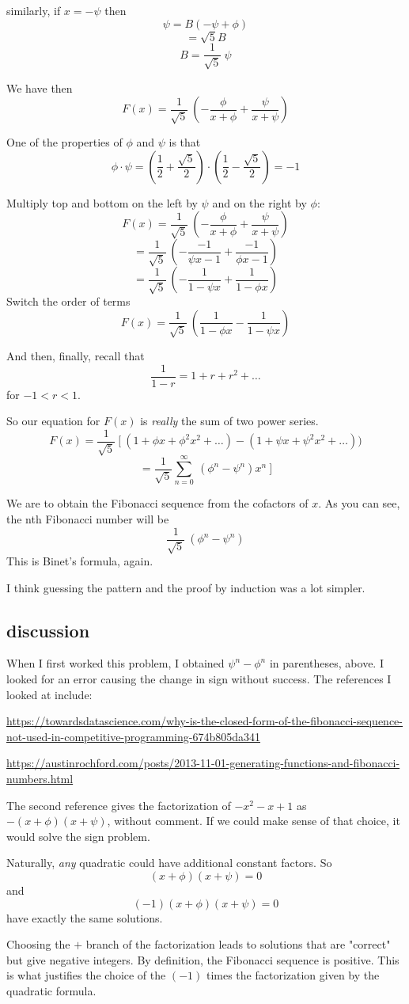 \documentclass[11pt, oneside]{article}
\begin{document}
similarly, if $x = - \psi$ then
\[ \psi = B (- \psi + \phi)  \]
\[ = \sqrt{5} B \]
\[ B = \frac{1}{\sqrt{5}} \ \psi \]

We have then
\[ F(x) = \frac{1}{\sqrt{5}} \ ( - \frac{\phi}{x + \phi} + \frac{\psi}{x + \psi}  )\]

One of the properties of $\phi$ and $\psi$ is that
\[ \phi \cdot \psi = (\frac{1}{2} + \frac{\sqrt{5}}{2}) \cdot  (\frac{1}{2} - \frac{\sqrt{5}}{2}) = - 1 \]

Multiply top and bottom on the left by $\psi$ and on the right by $\phi$:
\[ F(x) = \frac{1}{\sqrt{5}} \ ( - \frac{\phi}{x + \phi} + \frac{\psi}{x + \psi}  )\]
\[ = \frac{1}{\sqrt{5}} \ ( - \frac{-1}{\psi x - 1} + \frac{-1}{\phi x - 1}  )\]
\[  = \frac{1}{\sqrt{5}} \ ( - \frac{1}{1 - \psi x} + \frac{1}{1 - \phi x}  )\]
Switch the order of terms
\[ F(x)  = \frac{1}{\sqrt{5}} \ (\frac{1}{1 - \phi x}  - \frac{1}{1 - \psi x} )\]

And then, finally, recall that 
\[ \frac{1}{1 - r} = 1 + r + r^2 + \dots \]
for $-1 < r < 1$.

So our equation for $F(x)$ is \emph{really} the sum of two power series.
\[ F(x) = \frac{1}{\sqrt{5}} \ [ \  ( 1 + \phi x + \phi^2x^2 + \dots)  - (1 + \psi x + \psi^2 x^2 + \dots)  )\]
\[ = \frac{1}{\sqrt{5}} \sum_{n=0}^{\infty} \ (\phi^n - \psi^n) x^n \ ] \]

We are to obtain the Fibonacci sequence from the cofactors of $x$.  As you can see, the nth Fibonacci number will be
\[ \frac{1}{\sqrt{5}} \ (\phi^n - \psi^n)  \]
This is Binet's formula, again.

I think guessing the pattern and the proof by induction was a lot simpler.

\subsection*{discussion}

When I first worked this problem, I obtained $\psi^n - \phi^n$ in parentheses, above.  I looked for an error causing the change in sign without success.  The references I looked at include:

\url{https://towardsdatascience.com/why-is-the-closed-form-of-the-fibonacci-sequence-not-used-in-competitive-programming-674b805da341}

\url{https://austinrochford.com/posts/2013-11-01-generating-functions-and-fibonacci-numbers.html}

The second reference gives the factorization of $-x^2 - x + 1$ as $-(x + \phi)(x + \psi)$, without comment.  If we could make sense of that choice, it would solve the sign problem.

Naturally, \emph{any} quadratic could have additional constant factors.  So
\[ (x + \phi)(x + \psi) = 0 \]
and
\[ (-1)(x + \phi)(x + \psi) = 0 \]
have exactly the same solutions.

Choosing the $+$ branch of the factorization leads to solutions that are "correct" but give negative integers.  By definition, the Fibonacci sequence is positive.  This is what justifies the choice of the $(-1)$ times the factorization given by the quadratic formula.
\end{document}

